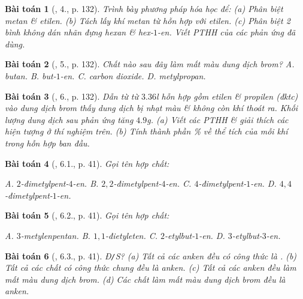 \documentclass{article}
\newtheorem{baitoan}{Bài toán}
\begin{document}
\begin{baitoan}[\cite{SGK_Hoa_Hoc_11_co_ban}, 4., p. 132]
	Trình bày phương pháp hóa học để: (a) Phân biệt metan \& etilen. (b) Tách lấy khí metan từ hỗn hợp với etilen. (c) Phân biệt 2 bình không dán nhãn đựng hexan \& hex-$1$-en. Viết PTHH của các phản ứng đã dùng.
\end{baitoan}

\begin{baitoan}[\cite{SGK_Hoa_Hoc_11_co_ban}, 5., p. 132]
	Chất nào sau đây làm mất màu dung dịch brom? {\sf A.} butan. {\sf B.} but-$1$-en. {\sf C.} carbon dioxide. {\sf D.} metylpropan.
\end{baitoan}

\begin{baitoan}[\cite{SGK_Hoa_Hoc_11_co_ban}, 6., p. 132]
	Dẫn từ từ $3.36$\emph{l} hỗn hợp gồm etilen \& propilen (đktc) vào dung dịch brom thấy dung dịch bị nhạt màu \& không còn khí thoát ra. Khối lượng dung dịch sau phản ứng tăng $4.9$\emph{g}. (a) Viết các PTHH \& giải thích các hiện tượng ở thí nghiệm trên. (b) Tính thành phần \% về thể tích của mỗi khí trong hỗn hợp ban đầu.
\end{baitoan}

\begin{baitoan}[\cite{SBT_Hoa_Hoc_11_co_ban}, 6.1., p. 41]
	Gọi tên hợp chất:
	\begin{center}
	\end{center}
	{\sf A.} $2$-đimetylpent-$4$-en. {\sf B.} $2,2$-đimetylpent-$4$-en. {\sf C.} $4$-đimetylpent-$1$-en. {\sf D.} $4,4$-đimetylpent-$1$-en.
\end{baitoan}

\begin{baitoan}[\cite{SBT_Hoa_Hoc_11_co_ban}, 6.2., p. 41]
	Gọi tên hợp chất:
	\begin{center}
	\end{center}
	{\sf A.} $3$-metylenpentan. {\sf B.} $1,1$-đietyleten. {\sf C.} $2$-etylbut-$1$-en. {\sf D.} $3$-etylbut-$3$-en.
\end{baitoan}

\begin{baitoan}[\cite{SBT_Hoa_Hoc_11_co_ban}, 6.3., p. 41]
	\emph{Đ\texttt{/}S?} (a) Tất cả các anken đều có công thức là \emph{}. (b) Tất cả các chất có công thức chung \emph{} đều là anken. (c) Tất cả các anken đều làm mất màu dung dịch brom. (d) Các chất làm mất màu dung dịch brom đều là anken.
\end{baitoan}
\end{document}
